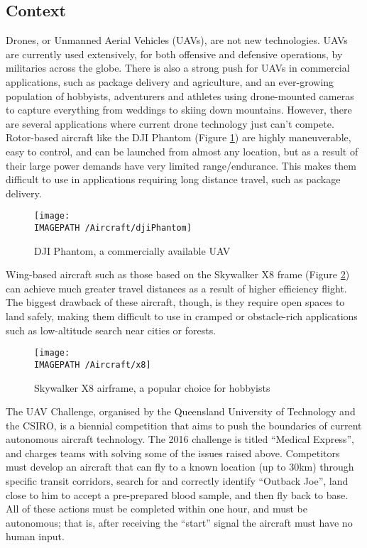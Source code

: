 \subsection{Context}
Drones, or Unmanned Aerial Vehicles (UAVs), are not new technologies. UAVs are currently used extensively, for both offensive\cite{ref:offence} and defensive\cite{ref:defence} operations, by militaries across the globe. There is also a strong push for UAVs in commercial applications, such as package delivery\cite{ref:package} and agriculture\cite{ref:agriculture}, and an ever-growing population of hobbyists\cite{ref:hobby}, adventurers\cite{ref:adventure} and athletes\cite{ref:sport} using drone-mounted cameras to capture everything from weddings to skiing down mountains. However, there are several applications where current drone technology just can't compete.\\

Rotor-based aircraft like the DJI Phantom (Figure \ref{fig:dji}) are highly maneuverable, easy to control, and can be launched from almost any location, but as a result of their large power demands have very limited range/endurance. This makes them difficult to use in applications requiring long distance travel, such as package delivery.

\begin{figure}[!h]
	\centering
	\texttt{[image: \\IMAGEPATH /Aircraft/djiPhantom]}
	\caption{DJI Phantom, a commercially available UAV}
	\label{fig:dji}
\end{figure}

Wing-based aircraft such as those based on the Skywalker X8 frame\cite{ref:x8} (Figure \ref{fig:x8}) can achieve much greater travel distances as a result of higher efficiency flight. The biggest drawback of these aircraft, though, is they require open spaces to land safely, making them difficult to use in cramped or obstacle-rich applications such as low-altitude search near cities or forests.

\begin{figure}[!h]
	\centering
	\texttt{[image: \\IMAGEPATH /Aircraft/x8]}
	\caption{Skywalker X8 airframe, a popular choice for hobbyists}
	\label{fig:x8}
\end{figure}
 
The UAV Challenge\cite{ref:challenge}, organised by the Queensland University of Technology and the CSIRO, is a biennial competition that aims to push the boundaries of current autonomous aircraft technology. The 2016 challenge is titled ``Medical Express'', and charges teams with solving some of the issues raised above. Competitors must develop an aircraft that can fly to a known location (up to 30km) through specific transit corridors, search for and correctly identify ``Outback Joe'', land close to him to accept a pre-prepared blood sample, and then fly back to base. All of these actions must be completed within one hour, and must be autonomous; that is, after receiving the ``start'' signal the aircraft must have no human input.\\

